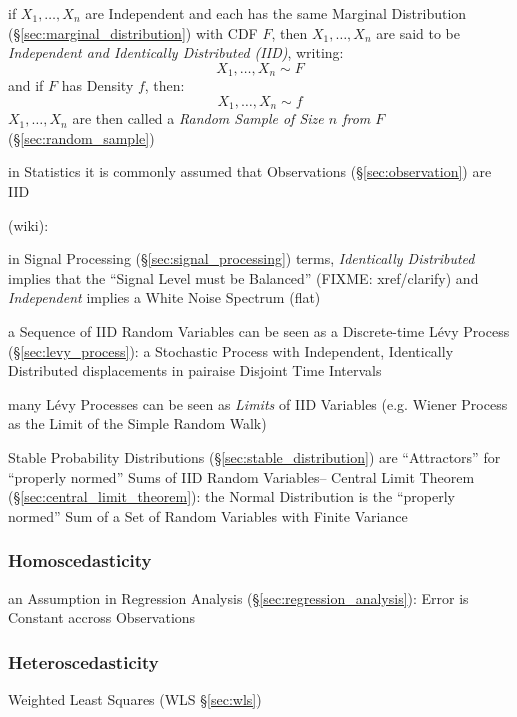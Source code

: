 if $X_1, \ldots, X_n$ are Independent and each has the same Marginal
Distribution (\S\ref{sec:marginal_distribution}) with CDF $F$, then $X_1,
\ldots, X_n$ are said to be \emph{Independent and Identically Distributed
  (IID)}, writing:
\[
  X_1, \ldots, X_n \sim F
\]
and if $F$ has Density $f$, then:
\[
  X_1, \ldots, X_n \sim f
\]
$X_1, \ldots, X_n$ are then called a \emph{Random Sample of Size $n$ from $F$}
(\S\ref{sec:random_sample})

in Statistics it is commonly assumed that Observations (\S\ref{sec:observation})
are IID

(wiki):

in Signal Processing (\S\ref{sec:signal_processing}) terms, \emph{Identically
  Distributed} implies that the ``Signal Level must be Balanced'' (FIXME:
xref/clarify) and \emph{Independent} implies a White Noise Spectrum (flat)

a Sequence of IID Random Variables can be seen as a Discrete-time L\'evy Process
(\S\ref{sec:levy_process}): a Stochastic Process with Independent, Identically
Distributed displacements in pairaise Disjoint Time Intervals

many L\'evy Processes can be seen as \emph{Limits} of IID Variables (e.g. Wiener
Process as the Limit of the Simple Random Walk)

Stable Probability Distributions (\S\ref{sec:stable_distribution}) are
``Attractors'' for ``properly normed'' Sums of IID Random Variables-- Central
Limit Theorem (\S\ref{sec:central_limit_theorem}): the Normal Distribution is
the ``properly normed'' Sum of a Set of Random Variables with Finite Variance



\subsubsection{Homoscedasticity}\label{sec:homoscedasticity}

an Assumption in Regression Analysis (\S\ref{sec:regression_analysis}): Error is
Constant accross Observations



\subsubsection{Heteroscedasticity}\label{sec:heteroscedasticity}

Weighted Least Squares (WLS \S\ref{sec:wls})



